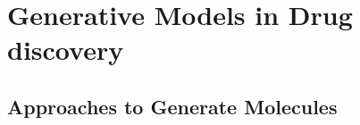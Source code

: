 



\section{Generative Models in Drug discovery\label{sec:generative-models}}
\subsection{Approaches to Generate Molecules}
